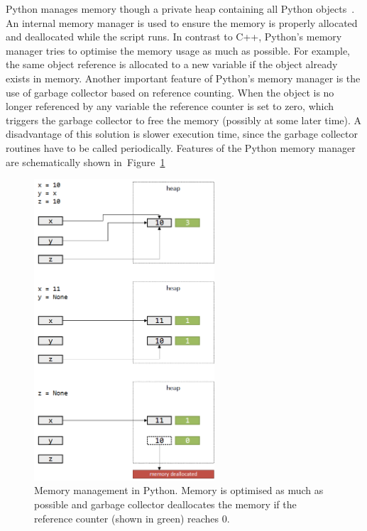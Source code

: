 Python manages memory though a private heap containing all Python objects~\cite{PythonMemory}. 
An internal memory manager is used to ensure the memory is properly allocated and deallocated 
while the script runs. In contrast to C++, Python's memory manager tries to optimise the memory 
usage as much as possible. For example, the same object reference is allocated to a new variable 
if the object already exists in memory. Another important feature of Python's memory manager is 
the use of garbage collector based on reference counting. When the object is no longer referenced 
by any variable the reference counter is set to zero, which triggers the garbage collector to free
the memory (possibly at some later time). A disadvantage of this solution is slower execution time,
since the garbage collector routines have to be called periodically. Features of the Python memory
manager are schematically shown in~Figure~\ref{fig:python_gc}

\begin{figure}[h!]
    \centering
    \includegraphics[width=0.6\textwidth]{img/python_gc}
    \caption{Memory management in Python. Memory is optimised as much as possible and garbage 
    collector deallocates the memory if the reference counter (shown in green) reaches 0.}
    \label{fig:python_gc}
\end{figure}

